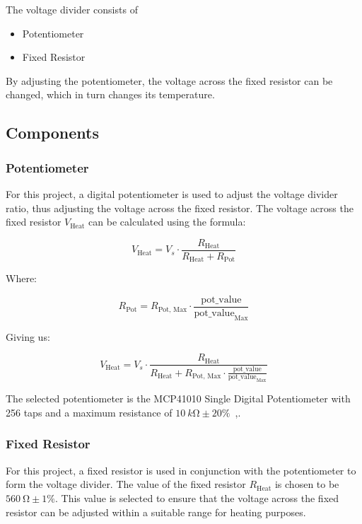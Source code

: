 \documentclass[12pt,a4paper]{article}
\begin{document}
The voltage divider consists of 
\begin{itemize}
    \item Potentiometer
    \item Fixed Resistor
\end{itemize} 
By adjusting the potentiometer, the voltage across the fixed resistor can be changed, which in turn changes its temperature.

\subsection{Components}
\subsubsection{Potentiometer}
For this project, a digital potentiometer is used to adjust the voltage divider ratio, thus adjusting the voltage across the fixed resistor. The voltage across the fixed resistor $V_{\text{Heat}}$ can be calculated using the formula:

\begin{equation*}
    V_{\text{Heat}} = V_s \cdot \frac{R_{\text{Heat}}}{R_{\text{Heat}} + R_{\text{Pot}}}
\end{equation*}

Where:

\begin{equation*}
    R_{\text{Pot}} = R_{\text{Pot, Max}} \cdot \frac{\text{pot\_value}}{\text{pot\_value}_{\text{Max}}}
\end{equation*}

Giving us:

\begin{equation}
    \label{eq:v-heat-theta}
    V_{\text{Heat}} = V_s \cdot \frac{R_{\text{Heat}}}{R_{\text{Heat}} + R_{\text{Pot, Max}} \cdot \frac{\text{pot\_value}}{\text{pot\_value}_{\text{Max}}}}
\end{equation}

The selected potentiometer is the MCP41010 Single Digital Potentiometer with 256 taps and a maximum resistance of $\SI{10}{k\ohm}\pm 20\%$~\cite{potentiometer},\cite{pot-tolerance}.

\subsubsection{Fixed Resistor}
For this project, a fixed resistor is used in conjunction with the potentiometer to form the voltage divider. The value of the fixed resistor $R_{\text{Heat}}$ is chosen to be $\SI{560}{\ohm}\pm 1\%$. This value is selected to ensure that the voltage across the fixed resistor can be adjusted within a suitable range for heating purposes.
\end{document}

